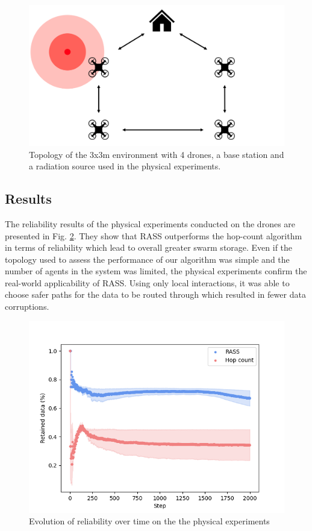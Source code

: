 \documentclass[letterpaper, 10 pt, conference]{ieeeconf}
\begin{document}
\begin{figure}[h]
	\centering
    \includegraphics[width=0.95\columnwidth]{figures/physical-topology.png}
    \caption{Topology of the 3x3m environment with 4 drones, a base station and a radiation source used in the physical experiments.}
    \label{cogniflyExperiment}
\vspace{-2mm}
\end{figure}

\subsection{Results}
The reliability results of the physical experiments conducted on the drones are presented in Fig. \ref{results:physicalRelaibility}. They show that RASS outperforms the hop-count algorithm in terms of reliability which lead to overall greater swarm storage. Even if the topology used to assess the performance of our algorithm was simple and the number of agents in the system was limited, the physical experiments confirm the real-world applicability of RASS. Using only local interactions, it was able to choose safer paths for the data to be routed through which resulted in fewer data corruptions.

\begin{figure}[h]
	\centering
    \includegraphics[width=0.95\columnwidth]{figures/reliability.png}
    \caption{Evolution of reliability over time on the the physical experiments}
    \label{results:physicalRelaibility}
\vspace{-2mm}
\end{figure}
\end{document}
